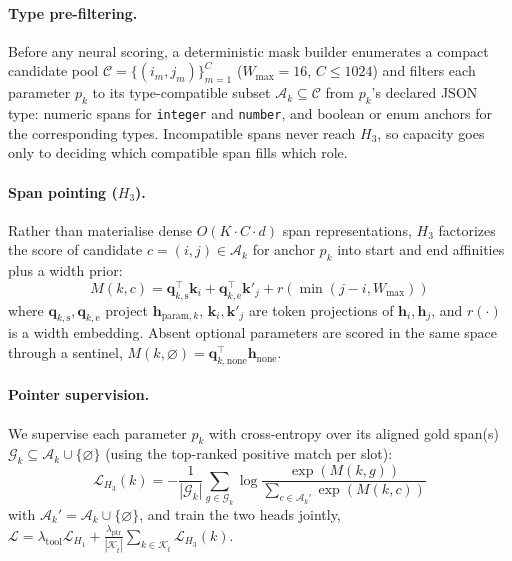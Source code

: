 \paragraph{Type pre-filtering.}
Before any neural scoring, a deterministic mask builder enumerates a compact candidate pool $\mathcal{C} = \{(i_m, j_m)\}_{m=1}^{C}$ ($W_{\max}{=}16$, $C \le 1024$) and filters each parameter $p_k$ to its type-compatible subset $\mathcal{A}_k \subseteq \mathcal{C}$ from $p_k$'s declared JSON type: numeric spans for \texttt{integer} and \texttt{number}, and boolean or enum anchors for the corresponding types. Incompatible spans never reach $H_3$, so capacity goes only to deciding which compatible span fills which role.

\paragraph{Span pointing ($H_3$).}
Rather than materialise dense $O(K \cdot C \cdot d)$ span representations, $H_3$ factorizes the score of candidate $c = (i, j) \in \mathcal{A}_k$ for anchor $p_k$ into start and end affinities plus a width prior:
\begin{equation}
    M(k, c) = \mathbf{q}_{k,\text{s}}^\top \mathbf{k}_i + \mathbf{q}_{k,\text{e}}^\top \mathbf{k}'_j + r\!\left(\min(j - i, W_{\max})\right)
\end{equation}
where $\mathbf{q}_{k,\text{s}}, \mathbf{q}_{k,\text{e}}$ project $\mathbf{h}_{\text{param}, k}$, $\mathbf{k}_i, \mathbf{k}'_j$ are token projections of $\mathbf{h}_i, \mathbf{h}_j$, and $r(\cdot)$ is a width embedding. Absent optional parameters are scored in the same space through a sentinel, $M(k, \varnothing) = \mathbf{q}_{k,\text{none}}^\top \mathbf{h}_{\text{none}}$.

\paragraph{Pointer supervision.}
We supervise each parameter $p_k$ with cross-entropy over its aligned gold span(s) $\mathcal{G}_k \subseteq \mathcal{A}_k \cup \{\varnothing\}$ (using the top-ranked positive match per slot):
\begin{equation}
    \mathcal{L}_{H_3}(k) = -\frac{1}{|\mathcal{G}_k|} \sum_{g \in \mathcal{G}_k} \log \frac{\exp(M(k, g))}{\sum_{c \in \mathcal{A}_k'} \exp(M(k, c))}
\end{equation}
with $\mathcal{A}_k' = \mathcal{A}_k \cup \{\varnothing\}$, and train the two heads jointly, $\mathcal{L} = \lambda_{\text{tool}} \mathcal{L}_{H_1} + \frac{\lambda_{\text{ptr}}}{|\mathcal{K}_{\hat{t}}|} \sum_{k \in \mathcal{K}_{\hat{t}}} \mathcal{L}_{H_3}(k)$.

